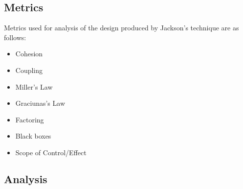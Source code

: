 \documentclass{article}
\begin{document}
	\subsection{Metrics}
		Metrics used for analysis of the design produced by Jackson's technique are as follows:
		\begin{itemize}
			\item Cohesion
			\item Coupling
			\item Miller's Law
			\item Graciunas's Law
			\item Factoring
			\item Black boxes
			\item Scope of Control/Effect
		\end{itemize}
	\subsection{Analysis}
\end{document}
